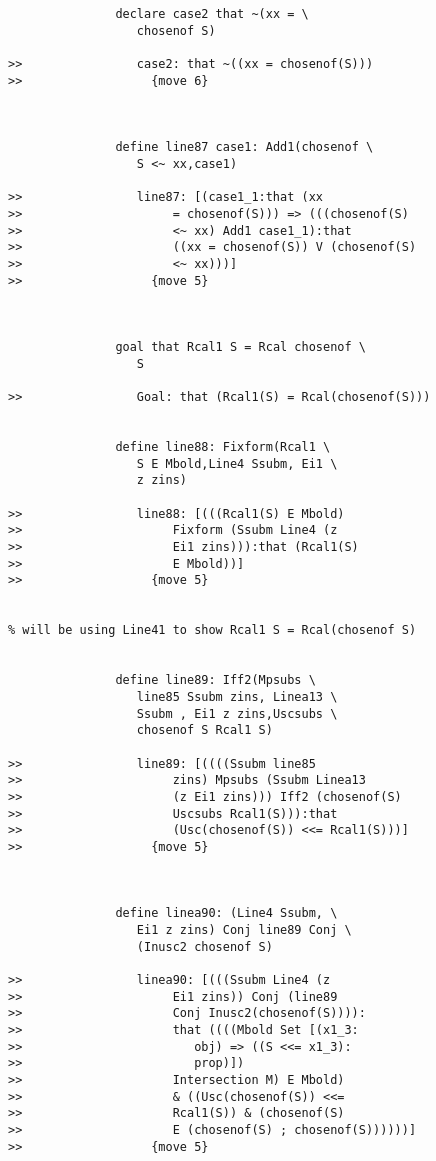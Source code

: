\documentclass[12pt]{article}
\begin{document}
\begin{verbatim}
               declare case2 that ~(xx = \
                  chosenof S)

>>                case2: that ~((xx = chosenof(S)))
>>                  {move 6}



               define line87 case1: Add1(chosenof \
                  S <~ xx,case1)

>>                line87: [(case1_1:that (xx
>>                     = chosenof(S))) => (((chosenof(S)
>>                     <~ xx) Add1 case1_1):that
>>                     ((xx = chosenof(S)) V (chosenof(S)
>>                     <~ xx)))]
>>                  {move 5}



               goal that Rcal1 S = Rcal chosenof \
                  S

>>                Goal: that (Rcal1(S) = Rcal(chosenof(S)))


               define line88: Fixform(Rcal1 \
                  S E Mbold,Line4 Ssubm, Ei1 \
                  z zins)

>>                line88: [(((Rcal1(S) E Mbold)
>>                     Fixform (Ssubm Line4 (z
>>                     Ei1 zins))):that (Rcal1(S)
>>                     E Mbold))]
>>                  {move 5}


% will be using Line41 to show Rcal1 S = Rcal(chosenof S)


               define line89: Iff2(Mpsubs \
                  line85 Ssubm zins, Linea13 \
                  Ssubm , Ei1 z zins,Uscsubs \
                  chosenof S Rcal1 S)

>>                line89: [((((Ssubm line85
>>                     zins) Mpsubs (Ssubm Linea13
>>                     (z Ei1 zins))) Iff2 (chosenof(S)
>>                     Uscsubs Rcal1(S))):that
>>                     (Usc(chosenof(S)) <<= Rcal1(S)))]
>>                  {move 5}



               define linea90: (Line4 Ssubm, \
                  Ei1 z zins) Conj line89 Conj \
                  (Inusc2 chosenof S)

>>                linea90: [(((Ssubm Line4 (z
>>                     Ei1 zins)) Conj (line89
>>                     Conj Inusc2(chosenof(S)))):
>>                     that ((((Mbold Set [(x1_3:
>>                        obj) => ((S <<= x1_3):
>>                        prop)])
>>                     Intersection M) E Mbold)
>>                     & ((Usc(chosenof(S)) <<=
>>                     Rcal1(S)) & (chosenof(S)
>>                     E (chosenof(S) ; chosenof(S))))))]
>>                  {move 5}




\end{verbatim}
\end{document}
